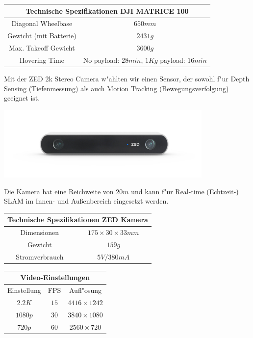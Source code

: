 \documentclass[a4paper]{article}
\begin{document}
\begin{center}
\begin{tabular}{ c | c }
\hline
\multicolumn{2}{c}{Technische Spezifikationen DJI MATRICE 100}\\
\hline
Diagonal Wheelbase & $650mm$\\
Gewicht (mit Batterie) & $2431g$\\
Max. Takeoff Gewicht & $3600g$\\
Hovering Time & No payload: $28 min$, $1Kg$ payload: $16 min$
\end{tabular}
\end{center}

Mit der ZED 2k Stereo Camera w"ahlten wir einen Sensor, der sowohl f"ur Depth Sensing (Tiefenmessung) als auch Motion Tracking (Bewegungsverfolgung) geeignet ist. 
\begin{center}
\includegraphics[width=0.8\textwidth]{ZED_camera.jpg}
\end{center}
Die Kamera hat eine Reichweite von $20m$ und kann f"ur Real-time (Echtzeit-) SLAM im Innen- und Außenbereich eingesetzt werden. 
\begin{center}
\begin{tabular}{ c c }
\hline
\multicolumn{2}{c}{Technische Spezifikationen ZED Kamera}\\
\hline
Dimensionen & $175\times30\times33 mm$\\
Gewicht & $159 g$\\
Stromverbrauch & $5V / 380mA$
\end{tabular}
\end{center}

\begin{center}
\begin{tabular}{ c c c }
\hline
\multicolumn{3}{c}{Video-Einstellungen}\\
\hline
Einstellung & FPS & Aufl"osung\\
$2.2K$ & $15$ & $4416\times1242$\\
$1080p$ & $30$ & $3840\times1080$\\
$720p$ & $60$ & $2560\times720$
\end{tabular}
\end{center}
\end{document}
